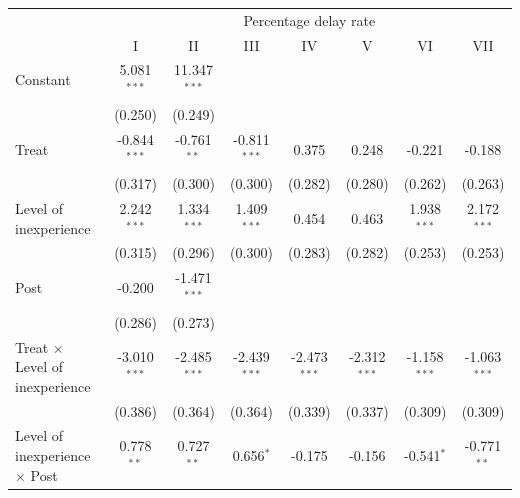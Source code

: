 \documentclass[
]{article}
\begin{document}
\begin{tabular}{lccccccc}
   \toprule
    & \multicolumn{7}{c}{Percentage delay rate}\\
                                                        & I              & II             & III            & IV             & V              & VI             & VII\\  
   Constant                                             & 5.081$^{***}$  & 11.347$^{***}$ &                &                &                &                &   \\   
                                                        & (0.250)        & (0.249)        &                &                &                &                &   \\   
   Treat                                                & -0.844$^{***}$ & -0.761$^{**}$  & -0.811$^{***}$ & 0.375          & 0.248          & -0.221         & -0.188\\   
                                                        & (0.317)        & (0.300)        & (0.300)        & (0.282)        & (0.280)        & (0.262)        & (0.263)\\   
   Level of inexperience                                & 2.242$^{***}$  & 1.334$^{***}$  & 1.409$^{***}$  & 0.454          & 0.463          & 1.938$^{***}$  & 2.172$^{***}$\\   
                                                        & (0.315)        & (0.296)        & (0.300)        & (0.283)        & (0.282)        & (0.253)        & (0.253)\\   
   Post                                                 & -0.200         & -1.471$^{***}$ &                &                &                &                &   \\   
                                                        & (0.286)        & (0.273)        &                &                &                &                &   \\   
   Treat $\times$ Level of inexperience                 & -3.010$^{***}$ & -2.485$^{***}$ & -2.439$^{***}$ & -2.473$^{***}$ & -2.312$^{***}$ & -1.158$^{***}$ & -1.063$^{***}$\\   
                                                        & (0.386)        & (0.364)        & (0.364)        & (0.339)        & (0.337)        & (0.309)        & (0.309)\\   
   Level of inexperience $\times$ Post                  & 0.778$^{**}$   & 0.727$^{**}$   & 0.656$^{*}$    & -0.175         & -0.156         & -0.541$^{*}$   & -0.771$^{**}$\\   

\end{tabular}
\end{document}
